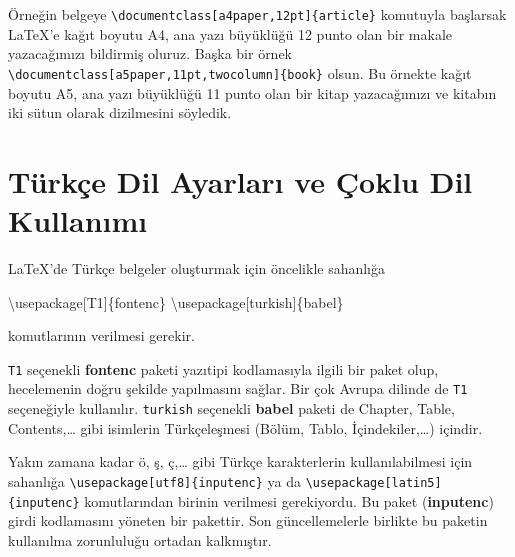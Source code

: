 \documentclass[
  letterpaper,
  DIV=11,
  numbers=noendperiod]{scrreprt}
\newenvironment{Shaded}{\begin{snugshade}}{\end{snugshade}}
\newcommand{\BuiltInTok}[1]{\textcolor[rgb]{0.00,0.23,0.31}{#1}}
\newcommand{\ExtensionTok}[1]{\textcolor[rgb]{0.00,0.23,0.31}{#1}}
\newcommand{\NormalTok}[1]{\textcolor[rgb]{0.00,0.23,0.31}{#1}}
\begin{document}
Örneğin belgeye
\texttt{\textbackslash{}documentclass{[}a4paper,12pt{]}\{article\}}
komutuyla başlarsak {\LaTeX}'e kağıt boyutu A4, ana yazı büyüklüğü 12
punto olan bir makale yazacağımızı bildirmiş oluruz. Başka bir örnek
\texttt{\textbackslash{}documentclass{[}a5paper,11pt,twocolumn{]}\{book\}}
olsun. Bu örnekte kağıt boyutu A5, ana yazı büyüklüğü 11 punto olan bir
kitap yazacağımızı ve kitabın iki sütun olarak dizilmesini söyledik.

\hypertarget{tuxfcrkuxe7e-dil-ayarlarux131-ve-uxe7oklu-dil-kullanux131mux131}{%
\section{Türkçe Dil Ayarları ve Çoklu Dil
Kullanımı}\label{tuxfcrkuxe7e-dil-ayarlarux131-ve-uxe7oklu-dil-kullanux131mux131}}

{\LaTeX}'de Türkçe belgeler oluşturmak için öncelikle sahanlığa

\begin{Shaded}
\begin{Highlighting}[]
\BuiltInTok{\textbackslash{}usepackage}\NormalTok{[T1]\{}\ExtensionTok{fontenc}\NormalTok{\}}
\BuiltInTok{\textbackslash{}usepackage}\NormalTok{[turkish]\{}\ExtensionTok{babel}\NormalTok{\}}
\end{Highlighting}
\end{Shaded}

komutlarının verilmesi gerekir.

\texttt{T1} seçenekli \textbf{fontenc} paketi yazıtipi kodlamasıyla
ilgili bir paket olup, hecelemenin doğru şekilde yapılmasını sağlar. Bir
çok Avrupa dilinde de \texttt{T1} seçeneğiyle kullanılır.
\texttt{turkish} seçenekli \textbf{babel} paketi de Chapter, Table,
Contents,\ldots{} gibi isimlerin Türkçeleşmesi (Bölüm, Tablo,
İçindekiler,\ldots) içindir.

\begin{tcolorbox}[enhanced jigsaw, opacitybacktitle=0.6, coltitle=black, leftrule=.75mm, rightrule=.15mm, toprule=.15mm, bottomtitle=1mm, titlerule=0mm, colbacktitle=quarto-callout-note-color!10!white, breakable, arc=.35mm, opacityback=0, colframe=quarto-callout-note-color-frame, toptitle=1mm, title=\textcolor{quarto-callout-note-color}{\faInfo}\hspace{0.5em}{Not}, bottomrule=.15mm, left=2mm, colback=white]
Yakın zamana kadar ö, ş, ç,\dots{} gibi Türkçe karakterlerin
kullanılabilmesi için sahanlığa
\texttt{\textbackslash{}usepackage{[}utf8{]}\{inputenc\}} ya da
\texttt{\textbackslash{}usepackage{[}latin5{]}\{inputenc\}}
komutlarından birinin verilmesi gerekiyordu. Bu paket
(\textbf{inputenc}) girdi kodlamasını yöneten bir pakettir. Son
güncellemelerle birlikte bu paketin kullanılma zorunluluğu ortadan
kalkmıştır.
\end{tcolorbox}
\end{document}
